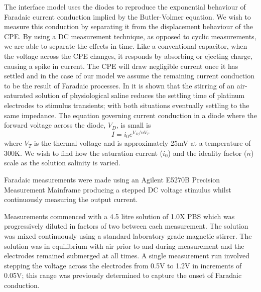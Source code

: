 \documentclass[journal, a4paper]{IEEEtran}
\begin{document}
The interface model uses the diodes to reproduce the exponential behaviour of Faradaic current conduction implied by the Butler-Volmer equation. We wish to measure this conduction by separating it from the displacement behaviour of the CPE. By using a DC measurement technique, as opposed to cyclic measurements, we are able to separate the effects in time.
Like a conventional capacitor, when the voltage across the CPE changes, it responds by absorbing or ejecting charge, causing a spike in current. The CPE will draw negligible current once it has settled and in the case of our model we assume the remaining current conduction to be the result of Faradaic processes.
In \cite{Greatbatch1969} it is shown that the stirring of an air-saturated solution of physiological saline reduces the settling time of platinum electrodes to stimulus transients; with both situations eventually settling to the same impedance.
The equation governing current conduction in a diode where the forward voltage across the diode, $V_{D}$, is small is
\begin{equation}
    I = i_{0}  e^{V_{D} / n V_{T}}
\end{equation}
where $V_{T}$ is the thermal voltage and is approximately 25\thinspace mV at a temperature of 300\thinspace K. We wish to find how the saturation current ($i_{0}$) and the ideality factor ($n$) scale as the solution salinity is varied.

Faradaic measurements were made using an Agilent E5270B Precision Measurement Mainframe producing a stepped DC voltage stimulus whilst continuously measuring the output current.

Measurements commenced with a 4.5 litre solution of 1.0X PBS which was progressively diluted in factors of two between each measurement. The solution was mixed continuously using a standard laboratory grade magnetic stirrer. The solution was in equilibrium with air prior to and during measurement and the electrodes remained submerged at all times.
A single measurement run involved stepping the voltage across the electrodes from 0.5\thinspace V to 1.2\thinspace V in increments of 0.05\thinspace V; this range was previously determined to capture the onset of Faradaic conduction.
\end{document}
